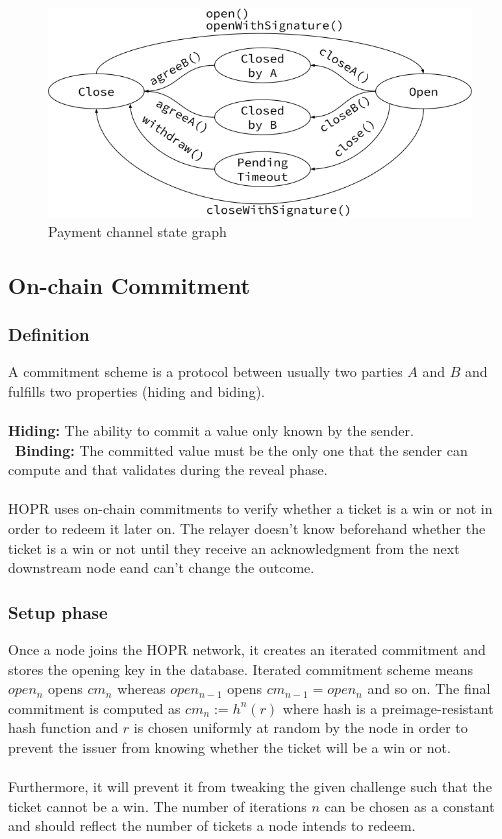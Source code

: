 \begin{figure}[H]
    \centering
    \includegraphics[width=\textwidth,keepaspectratio]{../yellowpaper/images/payment_channel_graph.png}
    \caption{Payment channel state graph}
    \label{fig:Payment channel graph}
\end{figure}
\subsection{On-chain Commitment}

\subsubsection*{Definition}
A commitment scheme is a protocol between usually two parties $A$ and $B$ and fulfills two properties (hiding and biding).
\\~\\\textbf{Hiding:} The ability to commit a value only known by the sender.
\\~\textbf{Binding:} The committed value must be the only one that the sender can compute and that validates during the reveal phase. 
\\~\\HOPR uses on-chain commitments to verify whether a ticket is a win or not in order to redeem it later on. The relayer doesn't know beforehand whether the ticket is a win or not until they receive an acknowledgment from the next downstream node eand can't change the outcome.
\subsubsection{Setup phase}
Once a node joins the HOPR network, it creates an iterated commitment and stores the opening key in the database. 
Iterated commitment scheme means $open_n$ opens $cm_n$ whereas $open_{n-1}$ opens $cm_{n-1}=open_n$ and so on. 
\newline The final commitment is computed as $cm_n:= h^n(r)$ where hash is a preimage-resistant hash function and 
$r$ is chosen uniformly at random by the node in order to prevent the issuer from knowing whether the ticket will be a win or not. 
\\~\\ Furthermore, it will prevent it from tweaking the given challenge such that the ticket cannot be a win.
The number of iterations $n$ can be chosen as a constant and should reflect the number of tickets a node intends to redeem.

